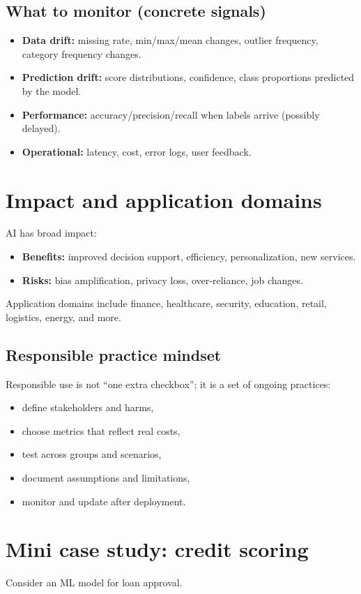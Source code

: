 \documentclass[11pt]{article}
\begin{document}
\subsection{What to monitor (concrete signals)}
\begin{itemize}[leftmargin=*]
  \item \textbf{Data drift:} missing rate, min/max/mean changes, outlier frequency, category frequency changes.
  \item \textbf{Prediction drift:} score distributions, confidence, class proportions predicted by the model.
  \item \textbf{Performance:} accuracy/precision/recall when labels arrive (possibly delayed).
  \item \textbf{Operational:} latency, cost, error logs, user feedback.
\end{itemize}

\section{Impact and application domains}
AI has broad impact:
\begin{itemize}[leftmargin=*]
  \item \textbf{Benefits:} improved decision support, efficiency, personalization, new services.
  \item \textbf{Risks:} bias amplification, privacy loss, over-reliance, job changes.
\end{itemize}
Application domains include finance, healthcare, security, education, retail, logistics, energy, and more.

\subsection{Responsible practice mindset}
Responsible use is not ``one extra checkbox''; it is a set of ongoing practices:
\begin{itemize}[leftmargin=*]
  \item define stakeholders and harms,
  \item choose metrics that reflect real costs,
  \item test across groups and scenarios,
  \item document assumptions and limitations,
  \item monitor and update after deployment.
\end{itemize}

\section{Mini case study: credit scoring}
Consider an ML model for loan approval.
\end{document}
